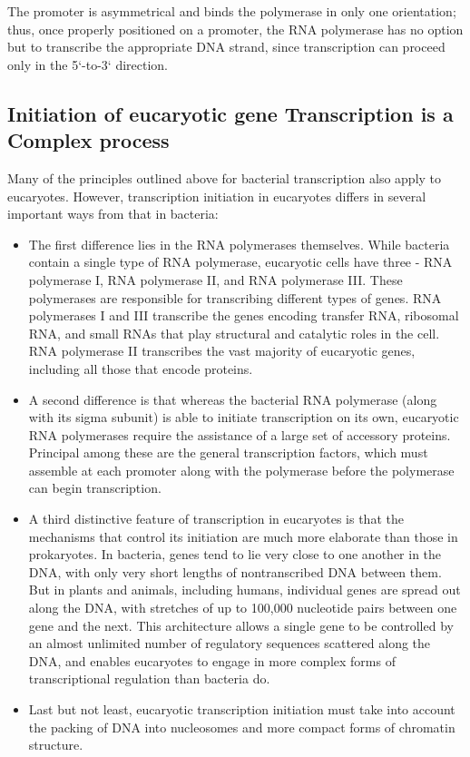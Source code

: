 The promoter is asymmetrical and binds the polymerase in only one orientation; thus, once properly
positioned on a promoter, the RNA polymerase has no option but to transcribe
the appropriate DNA strand, since transcription can proceed only
in the 5`-to-3` direction.

\subsection{Initiation of eucaryotic gene Transcription is a Complex process}

Many of the principles outlined above for bacterial transcription also
apply to eucaryotes. However, transcription initiation in eucaryotes differs
in several important ways from that in bacteria:

\begin{itemize}
\item The first difference lies in the RNA polymerases themselves. While
bacteria contain a single type of RNA polymerase, eucaryotic
cells have three - RNA polymerase I, RNA polymerase II, and RNA
polymerase III. These polymerases are responsible for transcribing
different types of genes. RNA polymerases I and III transcribe
the genes encoding transfer RNA, ribosomal RNA, and small RNAs
that play structural and catalytic roles in the cell.
RNA polymerase II transcribes the vast majority of eucaryotic genes,
including all those that encode proteins.
\item A second difference is that whereas the bacterial RNA polymerase
(along with its sigma subunit) is able to initiate transcription
on its own, eucaryotic RNA polymerases require the assistance of
a large set of accessory proteins. Principal among these are the
general transcription factors, which must assemble at each promoter
along with the polymerase before the polymerase can begin
transcription.
\item A third distinctive feature of transcription in eucaryotes is that
the mechanisms that control its initiation are much more elaborate
than those in prokaryotes. In bacteria, genes tend to lie very close to one another
in the DNA, with only very short lengths of nontranscribed DNA
between them. But in plants and animals, including humans, individual
genes are spread out along the DNA, with stretches of up
to 100,000 nucleotide pairs between one gene and the next. This
architecture allows a single gene to be controlled by an almost
unlimited number of regulatory sequences scattered along the
DNA, and enables eucaryotes to engage in more complex forms of
transcriptional regulation than bacteria do.
\item Last but not least, eucaryotic transcription initiation must take into
account the packing of DNA into nucleosomes and more compact
forms of chromatin structure.
\end{itemize}

